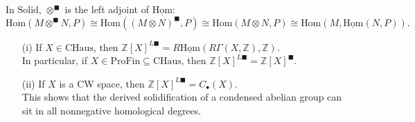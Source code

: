 \documentclass[UTF8,12,a4paper]{ctexart}
\theoremstyle{definition}
\begin{document}
\rem 
In $\text{Solid}$, $\otimes^\blacksquare$ is the left adjoint of $\underline{\text{Hom}}$:
$$
\text{Hom}(M\otimes^\blacksquare N,P)\cong
\text{Hom}((M\otimes N)^\blacksquare,P)\cong 
\text{Hom}(M\otimes N,P)\cong
\text{Hom}(M,\underline{\text{Hom}}(N,P)).
$$

\prop 
\begin{itemize}
	\item [(i)] If $X\in \text{CHaus}$, then $\mathbb{Z}[X]^{L\blacksquare}=R\underline{\text{Hom}}(R\Gamma(X,\mathbb{Z}),\mathbb{Z}).$ \\In particular, if $X\in\text{ProFin}\subseteq \text{CHaus}$, then $\mathbb{Z}[X]^{L\blacksquare}=\mathbb{Z}[X]^{\blacksquare}.$
	\item [(ii)] If $X$ is a CW space, then $\mathbb{Z}[X]^{L\blacksquare}=C_\bullet(X).$ \\
	This shows that the derived solidification of a condensed abelian group can sit in all nonnegative homological degrees.
\end{itemize}
\end{document}
